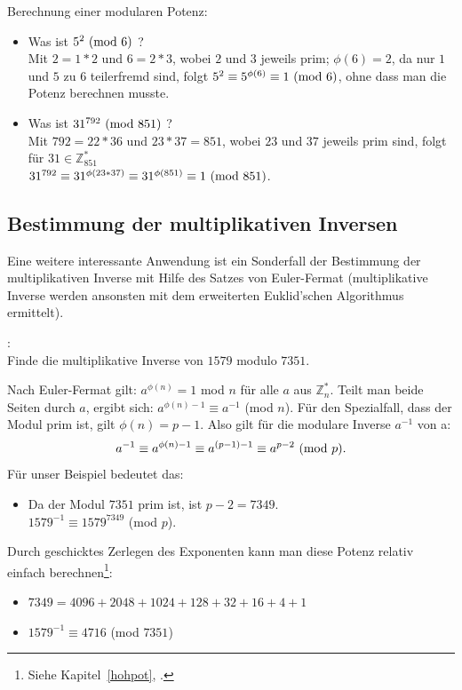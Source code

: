 \begin{refsegment}
\begin{example}{ Berechnung einer modularen Potenz:}
\vskip -4pt
\begin{itemize}
   \item Was ist $5^{2} {\rm ~(mod~}6)$ ?\\
         Mit $2 = 1 * 2$ und $6 = 2*3$, wobei $2$ und $3$ jeweils prim;
         $\phi(6) = 2$, da nur $1$ und $5$ zu $6$ teilerfremd
          sind, folgt
         $5^2 \equiv 5^{\phi(6)} \equiv 1 {\rm ~(mod~}6)$,
         ohne dass man die Potenz berechnen musste.
   \item Was ist $31^{792} {\rm ~(mod~}851)$ ?\\
         Mit $792 = 22 * 36$ und $23*37 = 851$, wobei $23$ und $37$ jeweils
         prim sind, folgt für $31 \in \mathbb{Z}_{851}^*$\\
         $31^{792} \equiv 31^{\phi(23*37)} \equiv 31^{\phi(851)} \equiv 1
         {\rm ~(mod~}851)$.
\end{itemize}
\end{example}

\subsection{Bestimmung der multiplikativen Inversen}

Eine weitere interessante Anwendung ist ein Sonderfall der Bestimmung der
multiplikativen Inverse mit Hilfe des Satzes von Euler-Fermat
(multiplikative Inverse werden ansonsten mit dem  erweiterten Euklid'schen
Algorithmus ermittelt).

\begin{example}{:}\\
Finde die multiplikative Inverse von $1579$ modulo $7351$.

Nach Euler-Fermat gilt: $a^{\phi(n)}= 1$ mod $n$ für alle $a$ aus $\mathbb{Z}_n^*$.
Teilt man beide Seiten durch $a$, ergibt sich: $a^{\phi(n) - 1} \equiv a^{-1}$ (mod $n$).
Für den Spezialfall, dass der Modul prim ist, gilt $\phi(n) = p - 1$.
Also gilt für die modulare Inverse $ a^{-1}$ von a:
$$a^{-1} \equiv a^{\phi(n) - 1} \equiv a^{(p-1)-1} \equiv a^{p-2} {\rm ~(mod~} p). $$
Für unser Beispiel bedeutet das:
\begin{itemize}
   \item[]  Da der Modul $7351$ prim ist, ist $p-2 = 7349$.\\
        $1579^{-1} \equiv 1579^{7349}$ (mod $p$).
\end{itemize}
Durch geschicktes Zerlegen des Exponenten kann man diese Potenz relativ einfach
berechnen\footnote{%
Siehe Kapitel~\ref{hohpot}, \glqq {}\grqq.
}:
\begin{itemize}
   \item[] $7349 = 4096 + 2048 + 1024 + 128 + 32 + 16 + 4 + 1$
   \item[] $1579^{-1} \equiv 4716$ (mod $7351$)
\end{itemize}
\end{example}


\end{refsegment}
